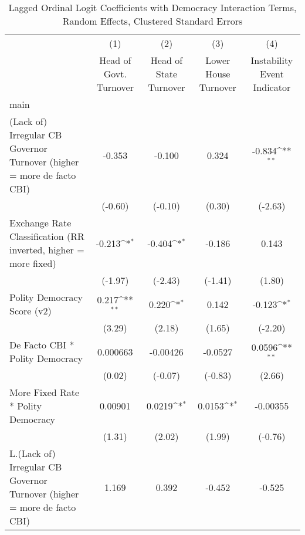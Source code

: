 {
\def\sym#1{\ifmmode^{#1}\else\(^{#1}\)\fi}
\begin{longtable}{l*{4}{c}}
\caption{Lagged Ordinal Logit Coefficients with Democracy Interaction Terms, Random Effects, Clustered Standard Errors \label{demintlagordLogLogDF}}\\
\hline\hline\endfirsthead\hline\endhead\hline\endfoot\endlastfoot
                &\multicolumn{1}{c}{(1)}&\multicolumn{1}{c}{(2)}&\multicolumn{1}{c}{(3)}&\multicolumn{1}{c}{(4)}\\
                &\multicolumn{1}{c}{Head of Govt. Turnover}&\multicolumn{1}{c}{Head of State Turnover}&\multicolumn{1}{c}{Lower House Turnover}&\multicolumn{1}{c}{Instability Event Indicator}\\
\hline
main            &                  &                  &                  &                  \\
(Lack of) Irregular CB Governor Turnover (higher = more de facto CBI)&   -0.353         &   -0.100         &    0.324         &   -0.834\sym{**} \\
                &  (-0.60)         &  (-0.10)         &   (0.30)         &  (-2.63)         \\
[1em]
Exchange Rate Classification (RR inverted, higher = more fixed)&   -0.213\sym{*}  &   -0.404\sym{*}  &   -0.186         &    0.143         \\
                &  (-1.97)         &  (-2.43)         &  (-1.41)         &   (1.80)         \\
[1em]
Polity Democracy Score (v2)&    0.217\sym{**} &    0.220\sym{*}  &    0.142         &   -0.123\sym{*}  \\
                &   (3.29)         &   (2.18)         &   (1.65)         &  (-2.20)         \\
[1em]
De Facto CBI * Polity Democracy& 0.000663         & -0.00426         &  -0.0527         &   0.0596\sym{**} \\
                &   (0.02)         &  (-0.07)         &  (-0.83)         &   (2.66)         \\
[1em]
More Fixed Rate * Polity Democracy&  0.00901         &   0.0219\sym{*}  &   0.0153\sym{*}  & -0.00355         \\
                &   (1.31)         &   (2.02)         &   (1.99)         &  (-0.76)         \\
[1em]
L.(Lack of) Irregular CB Governor Turnover (higher = more de facto CBI)&    1.169         &    0.392         &   -0.452         &   -0.525         \\

\end{longtable}}

